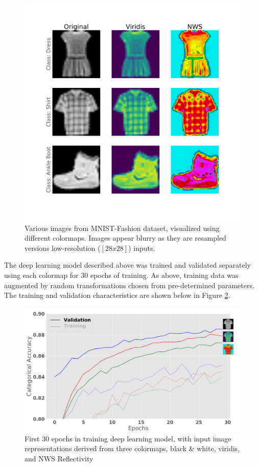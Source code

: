 \begin{figure}[ht]
	\centering
	\includegraphics[width=\textwidth]{./thesis_code/plots/mnist_fashion_examples_colormapped.png}
	\caption{Various images from MNIST-Fashion dataset, visualized using different colormaps. Images appear blurry as they are resampled versions low-resolution ($[28 x 28]$) inputs.}
	\label{fig:classifying_mnist-fashion_colormaps}
\end{figure}

The deep learning model described above was trained and validated separately using each colormap for 30 epochs of training. 
As above, training data was augmented by random transformations chosen from pre-determined parameters.
The training and validation characteristics are shown below in Figure \ref{fig:classifying_colormaps-short-training}.

\begin{figure}[ht]
	\centering
	\includegraphics[width=\textwidth]{./thesis_code/plots/train-val-acc_colormaps.png}
	\caption{First 30 epochs in training deep learning model, with input image representations derived from three colormaps, black \& white, viridis, and NWS Reflectivity}
	\label{fig:classifying_colormaps-short-training}
\end{figure}


